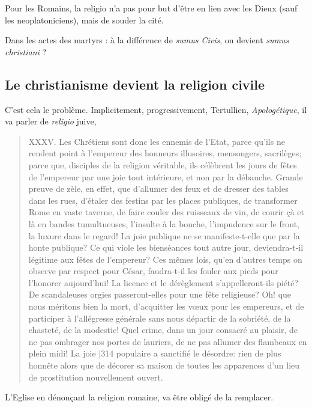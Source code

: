 \begin{Synthesis}
Pour les Romains, la religio n'a pas pour but d'être en lien avec les Dieux (sauf les neoplatoniciens), mais de souder la cité.
\end{Synthesis}
Dans les actes des martyrs : à la différence de \textit{sumus Civis}, on devient \textit{sumus christiani} ?

\subsection{Le christianisme devient la religion civile}

C'est cela le problème. Implicitement, progressivement, 
Tertullien, \textit{Apologétique}, il va parler de \textit{religio} juive, 

\begin{quote}
    XXXV. Les Chrétiens sont donc les ennemis de l'Etat, parce qu'ils ne rendent point à l'empereur des honneurs illusoires, mensongers, sacrilèges; parce que, disciples de la religion véritable, ils célèbrent les jours de fêtes de l'empereur par une joie tout intérieure, et non par la débauche. Grande preuve de zèle, en effet, que d'allumer des feux et de dresser des tables dans les rues, d'étaler des festins par les places publiques, de transformer Rome en vaste taverne, de faire couler des ruisseaux de vin, de courir çà et là en bandes tumultueuses, l'insulte à la bouche, l'impudence sur le front, la luxure dans le regard! La joie publique ne se manifeste-t-elle que par la honte publique? Ce qui viole les bienséances tout autre jour, deviendra-t-il légitime aux fêtes de l'empereur? Ces mêmes lois, qu'en d'autres temps on observe par respect pour César, faudra-t-il les fouler aux pieds pour l'honorer aujourd'hui! La licence et le dérèglement s'appelleront-ils piété? De scandaleuses orgies passeront-elles pour une fête religieuse? Oh! que nous méritons bien la mort, d'acquitter les vœux pour les empereurs, et de participer à l'allégresse générale sans nous départir de la sobriété, de la chasteté, de la modestie! Quel crime, dans un jour consacré au plaisir, de ne pas ombrager nos portes de lauriers, de ne pas allumer des flambeaux en plein midi! La joie |314 populaire a sanctifié le désordre: rien de plus honnête alors que de décorer sa maison de toutes les apparences d'un lieu de prostitution nouvellement ouvert.
\end{quote}
 
 L'Eglise en dénonçant la religion romaine, va être obligé de la remplacer. 

